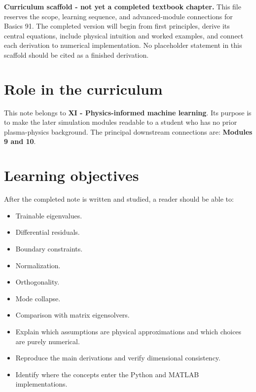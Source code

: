 \documentclass[11pt]{article}
\begin{document}

\begin{overviewbox}
\textbf{Curriculum scaffold - not yet a completed textbook chapter.} This file reserves the scope, learning sequence, and advanced-module connections for Basics 91. The completed version will begin from first principles, derive its central equations, include physical intuition and worked examples, and connect each derivation to numerical implementation. No placeholder statement in this scaffold should be cited as a finished derivation.
\end{overviewbox}

\ProjectTOC

\section{Role in the curriculum}
This note belongs to \textbf{XI - Physics-informed machine learning}. Its purpose is to make the later simulation modules readable to a student who has no prior plasma-physics background. The principal downstream connections are: \textbf{Modules 9 and 10}.

\section{Learning objectives}
After the completed note is written and studied, a reader should be able to:
\begin{itemize}[leftmargin=1.6em]
\item Trainable eigenvalues.
\item Differential residuals.
\item Boundary constraints.
\item Normalization.
\item Orthogonality.
\item Mode collapse.
\item Comparison with matrix eigensolvers.
\item Explain which assumptions are physical approximations and which choices are purely numerical.
\item Reproduce the main derivations and verify dimensional consistency.
\item Identify where the concepts enter the Python and MATLAB implementations.
\end{itemize}
\end{document}
